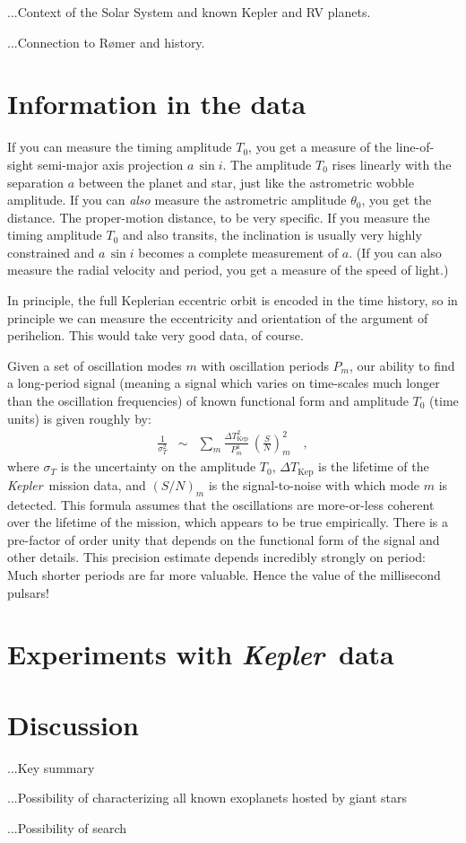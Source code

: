 \documentclass[12pt, preprint]{aastex}
\newcommand{\project}[1]{\textsl{#1}}
\newcommand{\Kepler}{\project{Kepler}}
\newcommand{\DeltaTKepler}{\Delta T_{\mathrm{Kep}}}
\begin{document}
...Context of the Solar System and known Kepler and RV planets.

...Connection to R\o mer and history.

\section{Information in the data}

If you can measure the timing amplitude $T_0$, you get a measure of
the line-of-sight semi-major axis projection $a\,\sin i$.
The amplitude $T_0$ rises linearly with the separation $a$ between the
planet and star, just like the astrometric wobble amplitude.
If you can \emph{also} measure the astrometric amplitude $\theta_0$,
you get the distance.
The proper-motion distance, to be very specific.
If you measure the timing amplitude $T_0$ and also transits, the
inclination is usually very highly constrained and $a\,\sin i$ becomes
a complete measurement of $a$.
(If you can also measure the radial velocity and period, you get a
measure of the speed of light.)

In principle, the full Keplerian eccentric orbit is encoded in the
time history, so in principle we can measure the eccentricity and
orientation of the argument of perihelion.
This would take very good data, of course.

Given a set of oscillation modes $m$ with oscillation periods $P_m$,
our ability to find a long-period signal (meaning a signal which
varies on time-scales much longer than the oscillation frequencies) of
known functional form and amplitude $T_0$ (time units) is given
roughly by:
\begin{eqnarray}
\frac{1}{\sigma_T^2} &\sim& \sum_m \frac{\DeltaTKepler^2}{P_m^4}\,\left(\frac{S}{N}\right)_m^2
\quad ,
\end{eqnarray}
where $\sigma_T$ is the uncertainty on the amplitude $T_0$,
$\DeltaTKepler$ is the lifetime of the \Kepler\ mission data, and
$(S/N)_m$ is the signal-to-noise with which mode $m$ is detected.
This formula assumes that the oscillations are more-or-less coherent
over the lifetime of the mission, which appears to be true
empirically.
There is a pre-factor of order unity that depends on the functional
form of the signal and other details.
This precision estimate depends incredibly strongly on period:
Much shorter periods are far more valuable.
Hence the value of the millisecond pulsars!

\section{Experiments with \Kepler\ data}

\section{Discussion}

...Key summary

...Possibility of characterizing all known exoplanets hosted by giant stars

...Possibility of search
\end{document}
